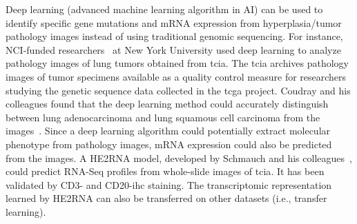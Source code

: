 \documentclass[12pt, a4paper]{article}
\begin{document}
Deep learning (advanced machine learning algorithm in AI) can be used to identify specific gene mutations and mRNA expression from hyperplasia/tumor pathology images instead of using traditional genomic sequencing. 
For instance, NCI-funded researchers~\citep{Coudray2018} at New York University used deep learning to analyze pathology images of lung tumors obtained from \acrfull{tcia}.
The \acrshort{tcia} archives pathology images of tumor specimens available as a quality control measure for researchers studying the genetic sequence data collected in the \acrshort{tcga} project.
Coudray and his colleagues found that the deep learning method could accurately distinguish between lung adenocarcinoma and lung squamous cell carcinoma from the images~\citep{Coudray2018}.
Since a deep learning algorithm could potentially extract molecular phenotype from pathology images, 
mRNA expression could also be predicted from the images.
A HE2RNA model, developed by Schmauch and his colleagues~\citep{Schmauch2020}, could predict RNA-Seq profiles from whole-slide images of \acrshort{tcia}. 
It has been validated by CD3- and CD20-\acrshort{ihc} staining. 
The transcriptomic representation learned by HE2RNA can also be transferred on other datasets (i.e., transfer learning).
\end{document}
